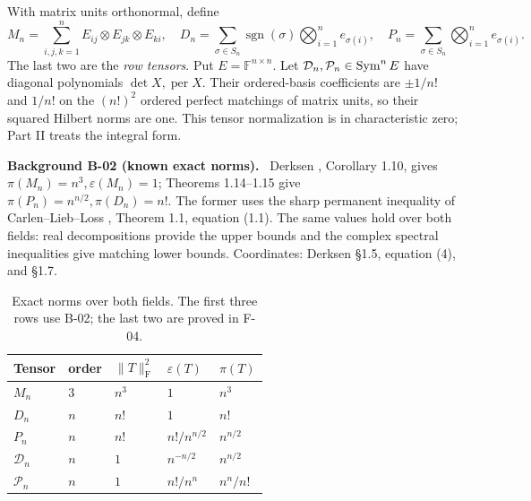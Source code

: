 \documentclass[11pt]{article}
\newcommand{\F}{\mathbb F}
\newcommand{\HS}[1]{\lVert #1\rVert_{\mathrm F}}
\newcommand{\eps}{\varepsilon}
\newcommand{\sgn}{\operatorname{sgn}}\newcommand{\diag}{\operatorname{Diag}}
\newenvironment{background}[2]{\par\medskip\noindent\textbf{Background #1 (#2).}\ }{\par\medskip}
\begin{document}
With matrix units orthonormal, define
\[
 M_n=\sum_{i,j,k=1}^n E_{ij}\otimes E_{jk}\otimes E_{ki},\quad
 D_n=\sum_{\sigma\in S_n}\sgn(\sigma)\bigotimes_{i=1}^n e_{\sigma(i)},
 \quad
 P_n=\sum_{\sigma\in S_n}\bigotimes_{i=1}^n e_{\sigma(i)}.
\]
The last two are the \emph{row tensors}. Put $E=\F^{n\times n}$.
Let $\mathcal D_n,\mathcal P_n\in\operatorname{Sym}^nE$ have diagonal polynomials
$\det X,\operatorname{per}X$. Their ordered-basis coefficients are
$\pm1/n!$ and $1/n!$ on the $(n!)^2$ ordered perfect matchings of
matrix units, so their squared Hilbert norms are one. This tensor
normalization is in characteristic zero; Part II treats the integral form.

\begin{background}{B-02}{known exact norms}
Derksen \cite{Der}, Corollary 1.10, gives
$\pi(M_n)=n^3,\eps(M_n)=1$; Theorems 1.14--1.15 give
$\pi(P_n)=n^{n/2},\pi(D_n)=n!$. The former uses the sharp
permanent inequality of Carlen--Lieb--Loss \cite{CLL}, Theorem 1.1,
equation (1.1). The same values hold over both fields: real
decompositions provide the upper bounds and the complex spectral
inequalities give matching lower bounds. Coordinates: Derksen
\S1.5, equation (4), and \S1.7.
\end{background}

\begin{table}[ht]\centering\small
\begin{tabular}{lllll}\toprule
Tensor & order & $\HS T^2$ & $\eps(T)$ & $\pi(T)$\\\midrule
$M_n$ & $3$ & $n^3$ & $1$ & $n^3$\\
$D_n$ & $n$ & $n!$ & $1$ & $n!$\\
$P_n$ & $n$ & $n!$ & $n!/n^{n/2}$ & $n^{n/2}$\\
$\mathcal D_n$ & $n$ & $1$ & $n^{-n/2}$ & $n^{n/2}$\\
$\mathcal P_n$ & $n$ & $1$ & $n!/n^n$ & $n^n/n!$\\\bottomrule
\end{tabular}
\caption{Exact norms over both fields. The first three rows use B-02;
the last two are proved in F-04.}\label{tab:norms}
\end{table}
\end{document}

